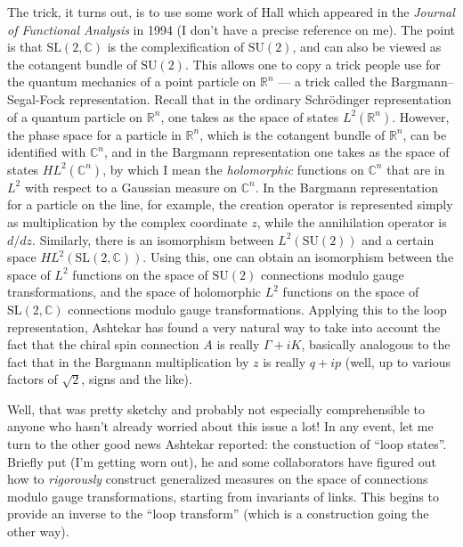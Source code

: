 \documentclass[12pt]{article}
\begin{document}
The trick, it turns out, is to use some work of Hall which appeared in
the \emph{Journal of Functional Analysis} in 1994 (I don't have a precise
reference on me). The point is that \(\mathrm{SL}(2,\mathbb{C})\) is the
complexification of \(\mathrm{SU}(2)\), and can also be viewed as the
cotangent bundle of \(\mathrm{SU}(2)\). This allows one to copy a trick
people use for the quantum mechanics of a point particle on
\(\mathbb{R}^n\) --- a trick called the Bargmann--Segal-Fock
representation. Recall that in the ordinary Schr\"odinger representation
of a quantum particle on \(\mathbb{R}^n\), one takes as the space of
states \(L^2(\mathbb{R}^n)\). However, the phase space for a particle in
\(\mathbb{R}^n\), which is the cotangent bundle of \(\mathbb{R}^n\), can
be identified with \(\mathbb{C}^n\), and in the Bargmann representation
one takes as the space of states \(HL^2(\mathbb{C}^n)\), by which I mean
the \emph{holomorphic} functions on \(\mathbb{C}^n\) that are in \(L^2\)
with respect to a Gaussian measure on \(\mathbb{C}^n\). In the Bargmann
representation for a particle on the line, for example, the creation
operator is represented simply as multiplication by the complex
coordinate \(z\), while the annihilation operator is \(d/dz\).
Similarly, there is an isomorphism between \(L^2(\mathrm{SU}(2))\) and a
certain space \(HL^2(\mathrm{SL}(2,\mathbb{C}))\). Using this, one can
obtain an isomorphism between the space of \(L^2\) functions on the
space of \(\mathrm{SU}(2)\) connections modulo gauge transformations,
and the space of holomorphic \(L^2\) functions on the space of
\(\mathrm{SL}(2,\mathbb{C})\) connections modulo gauge transformations.
Applying this to the loop representation, Ashtekar has found a very
natural way to take into account the fact that the chiral spin
connection \(A\) is really \(\Gamma + iK\), basically analogous to the
fact that in the Bargmann multiplication by \(z\) is really \(q + ip\)
(well, up to various factors of \(\sqrt{2}\), signs and the like).

Well, that was pretty sketchy and probably not especially comprehensible
to anyone who hasn't already worried about this issue a lot! In any
event, let me turn to the other good news Ashtekar reported: the
constuction of ``loop states''. Briefly put (I'm getting worn out), he
and some collaborators have figured out how to \emph{rigorously}
construct generalized measures on the space of connections modulo gauge
transformations, starting from invariants of links. This begins to
provide an inverse to the ``loop transform'' (which is a construction
going the other way).
\end{document}
